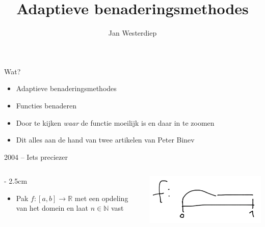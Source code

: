 \documentclass{beamer}
\title{Adaptieve benaderingsmethodes}
\author{Jan Westerdiep}
\newcommand{\R}{\mathbb{R}}
\newcommand{\N}{\mathbb{N}}
\begin{document}
\begin{frame}
\titlepage
\end{frame}

\begin{frame}{Wat?}
\begin{itemize}
  \item \alert<3>{Adaptieve} \alert<2>{benaderingsmethodes} \pause
  \item Functies benaderen \pause
  \item Door te kijken \emph{waar} de functie moeilijk is en daar in te zoomen \pause
  \item Dit alles aan de hand van twee artikelen van Peter Binev \pause
\end{itemize}
\end{frame}

\begin{frame}{2004 -- Iets preciezer}
\begin{columns}[t]
\begin{column}[T]{\linewidth - 2.5cm}
\begin{itemize}
  \item Pak $f: [a,b] \to \R$ met een opdeling van het domein en laat $n \in \N$ vast
\end{itemize}
\end{column}
\begin{column}[T]{2.5cm}
  \centering
  \includegraphics[width=\linewidth]{schets_0.png}\\

\end{column}
\end{columns}
\end{frame}
\end{document}
